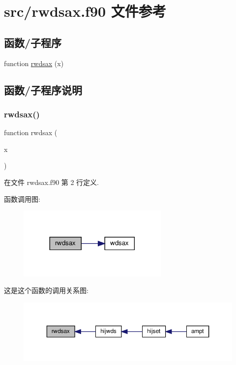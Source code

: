 \hypertarget{rwdsax_8f90}{}\section{src/rwdsax.f90 文件参考}
\label{rwdsax_8f90}
\subsection*{函数/子程序}
\begin{DoxyCompactItemize}
\item 
function \mbox{\hyperlink{rwdsax_8f90_aa1f450e77f0bc33102026a4b3cb22d77}{rwdsax}} (x)
\end{DoxyCompactItemize}


\subsection{函数/子程序说明}
\mbox{\label{rwdsax_8f90_aa1f450e77f0bc33102026a4b3cb22d77}} 
\subsubsection{\texorpdfstring{rwdsax()}{rwdsax()}}
{\footnotesize\ttfamily function rwdsax (\begin{DoxyParamCaption}\item[{}]{x }\end{DoxyParamCaption})}



在文件 rwdsax.\+f90 第 2 行定义.

函数调用图\+:
\nopagebreak
\begin{figure}[H]
\begin{center}
\leavevmode
\includegraphics[width=209pt]{rwdsax_8f90_aa1f450e77f0bc33102026a4b3cb22d77_cgraph}
\end{center}
\end{figure}
这是这个函数的调用关系图\+:
\nopagebreak
\begin{figure}[H]
\begin{center}
\leavevmode
\includegraphics[width=350pt]{rwdsax_8f90_aa1f450e77f0bc33102026a4b3cb22d77_icgraph}
\end{center}
\end{figure}
